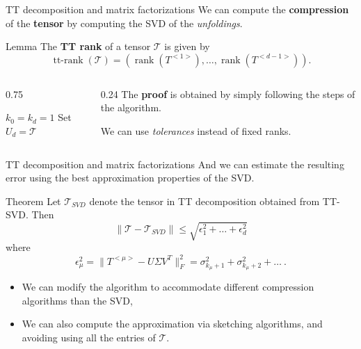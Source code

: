 \documentclass[aspectratio=169,xcolor=dvipsnames]{beamer}
\begin{document}
\begin{frame}{\faTrain\;TT decomposition and matrix factorizations}
We can compute the \textbf{compression} of the \textbf{tensor} by computing the SVD of the \emph{unfoldings}.
\begin{alertblock}{Lemma \parencite{MR2837533}}
	The \alert{\textbf{TT rank}} of a tensor $\mathcal T$ is given by\vspace{-1em}
	\[
	\operatorname{tt-rank}(\mathcal T)=(\operatorname{rank}(T^{<1>}),\dots,\operatorname{rank}(T^{<d-1>})).
	\]
\end{alertblock}
\begin{columns}
\begin{column}{0.75\columnwidth}\small
\begin{algorithm}[H]
$k_0=k_d=1$\;
Set $U_d=\mathcal T$\;
\caption{\textsc{TT-SVD}$(\mathcal T, k_1,\dots,k_d)$}
\end{algorithm}
\end{column}
\begin{column}{0.24\columnwidth}
\faBook\;The \alert{\textbf{proof}} is obtained by simply following the steps of the algorithm.

\faHammer\;We can use \emph{tolerances} instead of fixed ranks.
\end{column}
\end{columns}
\end{frame}

\begin{frame}{\faTrain\;TT decomposition and matrix factorizations}
And we can estimate the resulting error using the best approximation properties of the SVD.
\begin{alertblock}{Theorem \parencite{MR2837533}}
Let $\mathcal T_{SVD}$ denote the tensor in TT decomposition obtained from
TT-SVD. Then
\[
\|{\mathcal T-\mathcal T_{SVD}}\|\leq \sqrt{\epsilon_1^2+\dots +\epsilon_d^2}
\]
where
\[
\epsilon_\mu^2 =\|{T^{<\mu>}- U\Sigma V^T}\|_F^2=\sigma_{k_\mu+1}^2+\sigma_{k_\mu+2}^2+\dots\ .
\]
\end{alertblock}

\begin{itemize}
	\item[\faCog] We can modify the algorithm to accommodate different compression algorithms than the SVD,
	\item[\faCog] We can also compute the approximation via sketching algorithms, and avoiding using all the entries of $\mathcal{T}$.
\end{itemize}

\end{frame}
\end{document}
